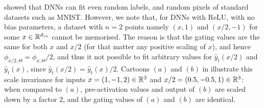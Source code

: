 \cite{ben} showed that DNNs can fit even random labels, and random pixels of standard datasets such as MNIST. However, we note that, for DNNs with ReLU, with no bias parameters, a dataset with $n=2$ points namely $(x,1)$ and $(x/2,-1)$ for some $x\in \mathbb{R}^{d_{in}}$ cannot be memorised. The reason is that the gating values are the same for both $x$ and $x/2$ (for that matter any positive scaling of $x$), and hence $\phi_{x/2,\Theta}= \phi_{x,\Theta}/2$, and thus it not possible to fit arbitrary values for $\hat{y}_t(x/2)$ and $\hat{y}_t(x)$, since $\hat{y}_t(x/2)= \hat{y}_t(x)/2$. Cartoons $(a)$ and $(b)$ in  illustrate this scale invariance for inputs $x=(1,-1,2)\in\mathbb{R}^3$ and $x/2=(0.5,-0.5,1)\in\mathbb{R}^3$:  when compared to $(a)$, pre-activation values and output of $(b)$ are scaled down by a factor $2$, and the gating values of $(a)$ and $(b)$ are identical.
